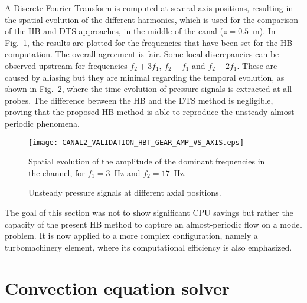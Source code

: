 A Discrete Fourier Transform is computed at several axis positions,
resulting in the spatial evolution of the different harmonics, which
is used for the comparison of the HB and DTS approaches, in the middle
of the canal ($z = 0.5$~m).  In
Fig.~\ref{fig:canal2_validation_hbt_gear_amp_vs_axis}, the results are
plotted for the frequencies that have been set for the HB computation.
The overall agreement is fair.  Some local discrepancies can be
observed upstream for frequencies $f_2 + 3f_1$, $f_2 - f_1$ and $f_2 -
2f_1$. These are caused by aliasing
 but they are minimal regarding the temporal evolution, as
shown in Fig.~\ref{fig:canal2_validation_hbt_gear_time_ev}, where the
time evolution of pressure signals is extracted at all probes.  The
difference between the HB and the DTS method is negligible, proving
that the proposed HB method is able to reproduce the unsteady
almost-periodic phenomena.
\begin{figure}[htbp]
  \centering
  \texttt{[image: CANAL2\_VALIDATION\_HBT\_GEAR\_AMP\_VS\_AXIS.eps]}
  \caption{Spatial evolution of the amplitude of the dominant
    frequencies in the channel, for $f_1 = 3$~Hz and $f_2 = 17$~Hz.}
  \label{fig:canal2_validation_hbt_gear_amp_vs_axis}
\end{figure}

\begin{figure}[htb]
  \centering 
   \quad{}
  \caption{Unsteady pressure signals at different axial positions.}
  \label{fig:canal2_validation_hbt_gear_time_ev}
\end{figure}

The goal of this section was not to show significant CPU savings but
rather the capacity of the present HB method to capture an
almost-periodic flow on a model problem.  It is now applied to a more
complex configuration, namely a turbomachinery element, where its
computational efficiency is also emphasized.






\section{Convection equation solver}




